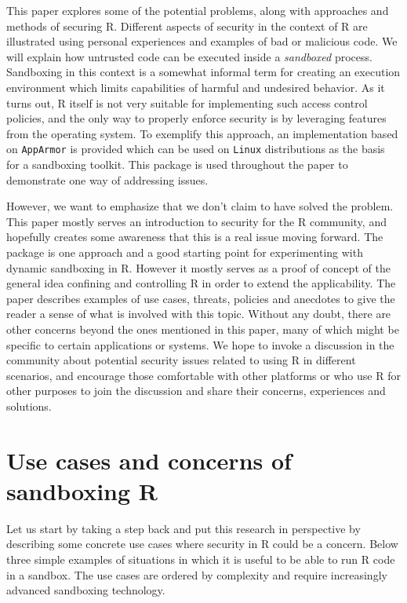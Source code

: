 \documentclass{jss}
\newcommand{\R}{\textsf{R}\xspace}
\newcommand{\AppArmor}{\texttt{AppArmor}\xspace}
\newcommand{\RAppArmor}{\pkg{RAppArmor}\xspace}
\newcommand{\Linux}{\texttt{Linux}\xspace}
\begin{document}
This paper explores some of the potential problems, along with approaches and
methods of securing \R. Different aspects of
security in the context of \R are illustrated using personal
experiences and examples of bad or malicious code. We will explain how untrusted
code can be executed inside a \emph{sandboxed} process. Sandboxing in
this context is a somewhat informal term for creating an execution environment which limits
capabilities of harmful and undesired behavior. 
As it turns out, \R itself is not very suitable for implementing such
access control policies, and the only way to properly enforce security is by
leveraging features from the operating system. To exemplify this approach, an
implementation based on \AppArmor is provided which can be
used on \Linux distributions as the basis for a sandboxing toolkit. This package
is used throughout the paper to demonstrate one way of addressing issues.

However, we want to emphasize that we don't claim to have solved the problem.
This paper mostly serves an introduction to security for the \R
community, and hopefully creates some awareness that this is a real issue moving
forward. The \RAppArmor package is one approach and a good starting point
for experimenting with dynamic sandboxing in \R. However it mostly
serves as a proof of concept of the general idea confining and controlling \R
in order to extend the applicability. The paper describes examples of use
cases, threats, policies and anecdotes to give the reader a sense
of what is involved with this topic. Without any doubt, there are other concerns
beyond the ones mentioned in this paper, many of which might be specific to
certain applications or systems. We hope to invoke a discussion in the community
about potential security issues related to using \R in
different scenarios, and encourage those comfortable with other platforms or who
use \R for other purposes to join the discussion and share their
concerns, experiences and solutions.

\section[Use cases and concerns of sandboxing R]{Use cases and concerns of
sandboxing \R}

Let us start by taking a step back and put this research in perspective by
describing some concrete use cases where security in \R could be a
concern. Below three simple examples of situations in which it is useful to
be able to run \R code in a sandbox. The use cases are ordered by
complexity and require increasingly advanced sandboxing technology.
\end{document}
